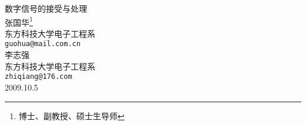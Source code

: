 \documentclass{ctexart}
\begin{document}
\begin{titlepage}
\vspace*{10mm}
\begin{center}
{\heiti\Huge 数字信号的接受与处理}\\[9mm]
{\Large 张国华\footnote{博士、副教授、硕士生导师}}\\[5mm]
东方科技大学电子工程系\\
\texttt{guohua@mail.com.cn}\\[9mm]
{\Large 李志强} \\[5mm]
东方科技大学电子工程系\\
\texttt{zhiqiang@176.com}\\[15mm]
2009.10.5
\end{center}
\end{titlepage}
\end{document}
